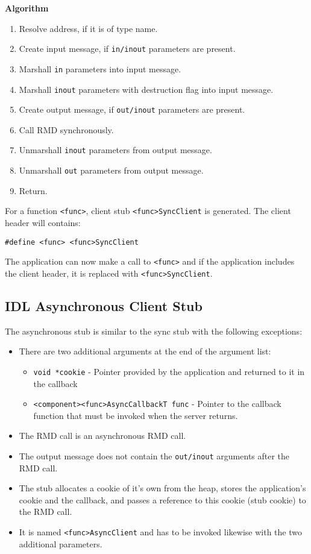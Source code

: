 \begin{flushleft}
\par
\textbf{Algorithm}
\begin{enumerate}
\item
Resolve address, if it is of type name.
\item
Create input message, if {\tt{in/inout}} parameters are present.
\item
Marshall {\tt{in}} parameters into input message.
\item
Marshall {\tt{inout}} parameters with destruction flag into input message.
\item
Create output message, if {\tt{out/inout}} parameters are present.
\item
Call RMD synchronously.
\item
Unmarshall {\tt{inout}} parameters from output message.
\item
Unmarshall {\tt{out}} parameters from output message.
\item
Return.
\end{enumerate}

For a function {\tt{<func>}}, client stub {\tt{<func>SyncClient}} is generated. The client header will contains:\par

{\tt{\#define <func> <func>SyncClient}}

\par
The application can now make a call to {\tt{<func>}} and if the application includes the client header, it is replaced with 
{\tt{<func>SyncClient}}.


\subsection{IDL Asynchronous Client Stub}

The asynchronous stub is similar to the sync stub with the following exceptions:
\begin{itemize}
\item
There are two additional arguments at the end of the argument list:
\begin{itemize}
\item
{\tt{void *cookie}} - Pointer provided by the application and returned to it in the callback
\item
{\tt{<component><func>AsyncCallbackT func}} - Pointer to the callback function that must be invoked when the server returns.
\end{itemize}
\item
The RMD call is an asynchronous RMD call.
\item
The output message does not contain the {\tt{out/inout}} arguments after the RMD call.
\item
The stub allocates a cookie of it's own from the heap, stores the application's cookie and the callback, and passes a reference to this cookie (stub cookie)
to the RMD call.
\item
It is named {\tt{<func>AsyncClient}} and has to be invoked likewise with the two additional parameters.
\end{itemize}


\end{flushleft}
